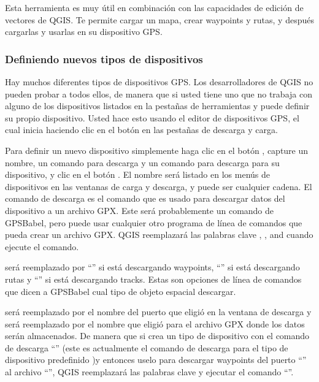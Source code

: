 Esta herramienta es muy útil en combinación con las capacidades de edición de vectores de QGIS. Te permite cargar un mapa, crear waypoints y rutas, y después cargarlas y usarlas en su dispositivo GPS.

\subsubsection{\label{sec:Defining-new-device}Definiendo nuevos tipos de dispositivos}

Hay muchos diferentes tipos de dispositivos GPS.
Los desarrolladores de QGIS no pueden probar a todos ellos, de manera que si usted tiene uno que no trabaja con alguno de los dispositivos listados en la pestañas de herramientas  y  puede definir su propio dispositivo.
Usted hace esto usando el editor de dispositivos GPS, el cual inicia haciendo clic en el botón  en las pestañas de descarga y carga.

Para definir un nuevo dispositivo simplemente haga clic en el botón , capture un nombre, un comando para descarga y un comando para descarga para su dispositivo, y clic en el botón .
El nombre será listado en los menús de dispositivos en las ventanas de carga y descarga, y puede ser cualquier cadena.
El comando de descarga es el comando que es usado para descargar datos del dispositivo a un archivo GPX.
Este será probablemente un comando de GPSBabel, pero puede usar cualquier otro programa de línea de comandos que pueda crear un archivo GPX.
QGIS reemplazará las palabras clave , , and  cuando ejecute el comando.

 será reemplazado por {}``'' si está descargando waypoints, {}``'' si está descargando rutas y {}``'' si está descargando tracks.
Estas son opciones de línea de comandos que dicen a GPSBabel cual tipo de objeto espacial descargar.

 será reemplazado por el nombre del puerto que eligió en la ventana de descarga y  será reemplazado por el nombre que eligió para el archivo GPX donde los datos serán almacenados.
De manera que si crea un tipo de dispositivo con el comando de descarga {}``'' (este es actualmente el comando de descarga para el tipo de dispositivo predefinido )y entonces uselo para descargar waypoints del puerto {}``'' al archivo {}``'', QGIS reemplazará las palabras clave y ejecutar el comando {}``''.

